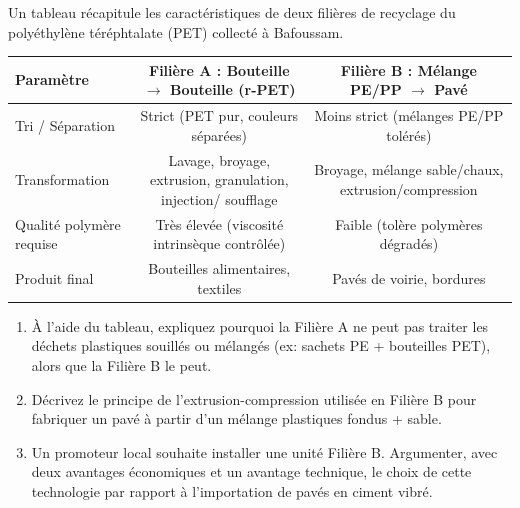 \documentclass[11pt]{article}
\begin{document}
\begin{exercice}
Un tableau récapitule les caractéristiques de deux filières de recyclage du polyéthylène téréphtalate (PET) collecté à Bafoussam.

\begin{tabularx}{\linewidth}{>{\raggedright\arraybackslash}Xcc}
\toprule
\textbf{Paramètre} & \textbf{Filière A : Bouteille $\rightarrow$ Bouteille (r-PET)} & \textbf{Filière B : Mélange PE/PP $\rightarrow$ Pavé} \\
\midrule
Tri / Séparation & Strict (PET pur, couleurs séparées) & Moins strict (mélanges PE/PP tolérés) \\
Transformation & Lavage, broyage, extrusion, granulation, injection/ soufflage & Broyage, mélange sable/chaux, extrusion/compression \\
Qualité polymère requise & Très élevée (viscosité intrinsèque contrôlée) & Faible (tolère polymères dégradés) \\
Produit final & Bouteilles alimentaires, textiles & Pavés de voirie, bordures \\
\bottomrule
\end{tabularx}

\begin{enumerate}
    \item À l'aide du tableau, expliquez pourquoi la Filière A ne peut pas traiter les déchets plastiques souillés ou mélangés (ex: sachets PE + bouteilles PET), alors que la Filière B le peut.
    \item Décrivez le principe de l'extrusion-compression utilisée en Filière B pour fabriquer un pavé à partir d'un mélange \og plastiques fondus + sable\fg{}.
    \item Un promoteur local souhaite installer une unité Filière B. Argumenter, avec deux avantages économiques et un avantage technique, le choix de cette technologie par rapport à l'importation de pavés en ciment vibré.
\end{enumerate}
\end{exercice}
\end{document}
